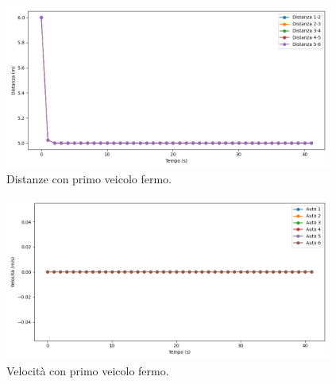 \begin{figure}[H]
    \includegraphics[width=0.96\textwidth]{images/5-experiment/velocity/distance_0-0-0-0-0.png}
    \caption{Distanze con primo veicolo fermo.}
    \label{fig:0-constvelocity-distance}
\end{figure}

\begin{figure}[H]
    \includegraphics[width=0.96\textwidth]{images/5-experiment/velocity/velocity_0-0-0-0-0.png}
    \caption{Velocità con primo veicolo fermo.}
    \label{fig:0-constvelocity-velocity}
\end{figure}

\newpage

